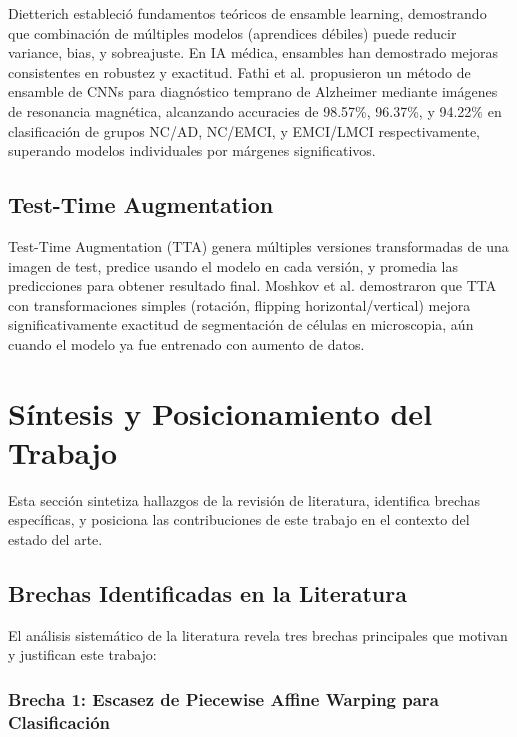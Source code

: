Dietterich \cite{dietterich2000ensemble} estableció fundamentos teóricos de ensamble learning, demostrando que combinación de múltiples modelos (aprendices débiles) puede reducir variance, bias, y sobreajuste. En IA médica, ensambles han demostrado mejoras consistentes en robustez y exactitud. Fathi et al. \cite{fathi2024alzheimer} propusieron un método de ensamble de CNNs para diagnóstico temprano de Alzheimer mediante imágenes de resonancia magnética, alcanzando accuracies de 98.57\%, 96.37\%, y 94.22\% en clasificación de grupos NC/AD, NC/EMCI, y EMCI/LMCI respectivamente, superando modelos individuales por márgenes significativos.

\subsection{Test-Time Augmentation}

Test-Time Augmentation (TTA) genera múltiples versiones transformadas de una imagen de test, predice usando el modelo en cada versión, y promedia las predicciones para obtener resultado final. Moshkov et al. \cite{moshkov2020testtime} demostraron que TTA con transformaciones simples (rotación, flipping horizontal/vertical) mejora significativamente exactitud de segmentación de células en microscopia, aún cuando el modelo ya fue entrenado con aumento de datos.

\section{Síntesis y Posicionamiento del Trabajo}
\label{sec:sintesis_posicionamiento}

Esta sección sintetiza hallazgos de la revisión de literatura, identifica brechas específicas, y posiciona las contribuciones de este trabajo en el contexto del estado del arte.

\subsection{Brechas Identificadas en la Literatura}

El análisis sistemático de la literatura revela tres brechas principales que motivan y justifican este trabajo:

\subsubsection{Brecha 1: Escasez de Piecewise Affine Warping para Clasificación}

